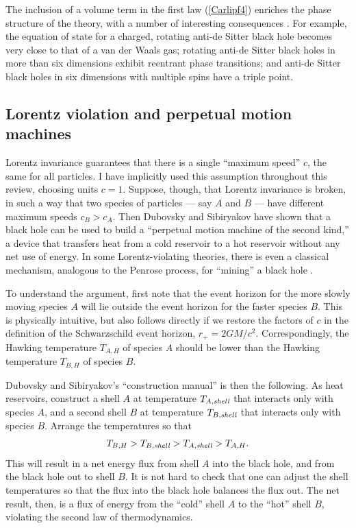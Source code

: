 \documentclass[11pt]{article}
\begin{document}
The inclusion of a volume term in the first law (\ref{Carlipf4}) enriches
the phase structure of the theory, with a number of interesting
consequences \cite{Dolan,MannKub}.  For example, 
the equation of state for a charged, rotating anti-de Sitter black hole 
becomes very close to that of a van der Waals gas; rotating anti-de Sitter 
black holes in more than six dimensions exhibit reentrant phase 
transitions; and anti-de Sitter black holes in six dimensions with multiple 
spins have a triple point.

\subsection{Lorentz violation and perpetual motion machines}

Lorentz invariance guarantees that there is a single ``maximum speed''
$c$, the same for all particles.  I have implicitly used this assumption 
throughout this review, choosing units $c=1$.  Suppose, though,
that Lorentz invariance is broken, in such a way that two species of
particles --- say $A$ and $B$ --- have different maximum speeds
$c_B>c_A$.  Then Dubovsky and Sibiryakov have shown  \cite{DubSib} 
that a black hole can be used to build a ``perpetual motion machine
of the second kind,'' a device that transfers heat from a cold reservoir to 
a hot reservoir without any net use of energy.  In some 
Lorentz-violating theories, there is even a classical mechanism, 
analogous to the Penrose process, for ``mining'' a black hole \cite{Eling}. 

To understand the argument, first note that the event horizon for
the more slowly moving species $A$ will lie outside the event horizon 
for the faster species $B$.  This is physically intuitive, but also follows
directly if we restore the factors of $c$ in the definition of the
Schwarzschild event horizon, $r_+ = 2GM/c^2$.
Correspondingly, the Hawking temperature $T_{A,H}$ of species $A$ 
should be lower than the Hawking temperature $T_{B,H}$ of species $B$.  

Dubovsky and Sibiryakov's ``construction manual'' is then the 
following.  As heat reservoirs, construct a shell $A$ at temperature
$T_{A,\hbox{\scriptsize\it shell}}$ that interacts only with species $A$,
and a second shell $B$ at temperature $T_{B,\hbox{\scriptsize\it shell}}$ 
that interacts only with species $B$.  Arrange the temperatures so that
\begin{align}
T_{B,H}>T_{B,\hbox{\scriptsize\it shell}}>T_{A,\hbox{\scriptsize\it shell}}
   >T_{A,H}  .
\label{Carlipf6}
\end{align}
This will result in a net energy flux from shell $A$ into the black hole,
and from the black hole out to shell $B$.   It is not hard to check that
one can adjust the shell temperatures so that the flux into the black
hole balances the flux out.  The net result, then, is a flux of energy
from the ``cold'' shell $A$ to the ``hot'' shell $B$, violating the
second law of thermodynamics.
\end{document}
